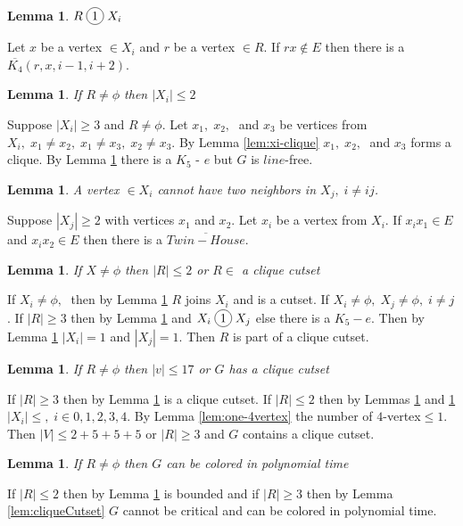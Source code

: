\documentclass[12pt]{article}
\newcommand*\circled[1]{\tikz[baseline=(char.base)]{
            \node[shape=circle,draw,inner sep=2pt] (char) {#1};}}
\newtheorem{Lemma}[Theorem]{Lemma}
\begin{document}
\begin{Lemma}\label{lem:r-join-xi}
$R \; \circled{1} \; X_i$
\end{Lemma}
 Let $x$ be a vertex $\in X_i$ and $r$ be a vertex $\in R$. If $rx \not \in E$ then there is a $\overline{K_4} (r, x, i-1, i+2)$.

\begin{Lemma}\label{lem:r-limits-xi}
If $R \neq \phi$ then $|X_i| \leq 2$
\end{Lemma}
 Suppose $|X_i| \geq 3$ and $R \neq \phi$. Let $x_1,\; x_2,\;$ and $x_3$ be vertices from $X_i,\; x_1 \neq x_2,\; x_1 \neq x_3,\; x_2 \neq x_3$. By Lemma \ref{lem:xi-clique} $x_1,\; x_2,\;$ and $x_3$ forms a clique. By Lemma \ref{lem:r-join-xi} there is a $K_5$ - $e$ but $G$ is $line$-free.

\begin{Lemma}\label{lem:2xi-cojoins-xj}
A vertex $\in X_i$ cannot have two neighbors in $X_j,\; i \neq ij$.
\end{Lemma}
 Suppose $|X_j| \geq 2$ with vertices $x_1$ and $x_2$. Let $x_i$ be a vertex from $X_{i}$. If $x_ix_1 \in E$ and $x_ix_2 \in E$ then there is a $\overline{Twin-House}$.

\begin{Lemma}\label{lem:xi-limits-r}
If $X \neq \phi$ then $|R| \leq 2$ or $R \in$ a clique cutset 
\end{Lemma}
 If $X_i \neq \phi,\;$ then by Lemma \ref{lem:r-join-xi} $R$ joins $X_i$ and is a cutset. If $X_i \neq \phi,\; X_j \neq \phi,\; i \neq j$. If $|R| \geq 3$ then by Lemma \ref{lem:r-join-xi} and $X_i \; \circled{1} \; X_j$ else there is a $K_5 - e$. Then by Lemma \ref{lem:2xi-cojoins-xj} $|X_i| = 1$ and $|X_j| = 1$. Then $R$ is part of a clique cutset.

\begin{Lemma}\label{lem:r-bounded}
If $R \neq \phi$ then $ |v| \leq 17$ or $G$ has a clique cutset
\end{Lemma}
 If $|R| \geq 3$ then by Lemma \ref{lem:xi-limits-r} is a clique cutset. If $|R| \leq 2$ then by Lemmas \ref{lem:r-limits-xi} and \ref{lem:2xi-cojoins-xj} $|X_i| \leq,\; i \in {0,1,2,3,4}$. By Lemma \ref{lem:one-4vertex} the number of $4$-vertex$ \leq 1$. Then $|V| \leq 2 + 5 + 5 + 5$ or $|R| \geq 3$ and $G$ contains a clique cutset.

\begin{Lemma}\label{lem:r-polynomial}
If $R \neq \phi$ then $G$ can be colored in polynomial time
\end{Lemma}
 If $|R| \leq 2$ then by Lemma \ref{lem:r-bounded} is bounded and if $|R| \geq 3$ then by Lemma \ref{lem:cliqueCutset} $G$ cannot be critical and can be colored in polynomial time.
\end{document}
